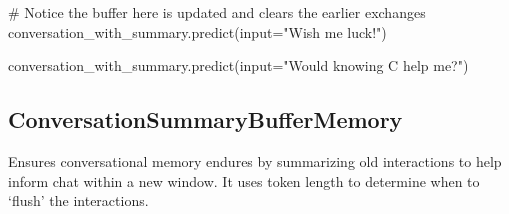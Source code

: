 \documentclass[
  letterpaper,
  DIV=11,
  numbers=noendperiod]{scrreprt}
\newenvironment{Shaded}{\begin{snugshade}}{\end{snugshade}}
\newcommand{\BuiltInTok}[1]{\textcolor[rgb]{0.00,0.23,0.31}{#1}}
\newcommand{\CommentTok}[1]{\textcolor[rgb]{0.37,0.37,0.37}{#1}}
\newcommand{\NormalTok}[1]{\textcolor[rgb]{0.00,0.23,0.31}{#1}}
\newcommand{\OperatorTok}[1]{\textcolor[rgb]{0.37,0.37,0.37}{#1}}
\newcommand{\StringTok}[1]{\textcolor[rgb]{0.13,0.47,0.30}{#1}}
\begin{document}
\begin{Shaded}
\begin{Highlighting}[]
\CommentTok{\# Notice the buffer here is updated and clears the earlier exchanges}
\NormalTok{conversation\_with\_summary.predict(}\BuiltInTok{input}\OperatorTok{=}\StringTok{"Wish me luck!"}\NormalTok{)}
\end{Highlighting}
\end{Shaded}

\begin{Shaded}
\begin{Highlighting}[]
\NormalTok{conversation\_with\_summary.predict(}\BuiltInTok{input}\OperatorTok{=}\StringTok{"Would knowing C help me?"}\NormalTok{)}
\end{Highlighting}
\end{Shaded}

\hypertarget{conversationsummarybuffermemory-1}{%
\subsection{ConversationSummaryBufferMemory}\label{conversationsummarybuffermemory-1}}

Ensures conversational memory endures by summarizing old interactions to
help inform chat within a new window. It uses token length to determine
when to `flush' the interactions.
\end{document}
